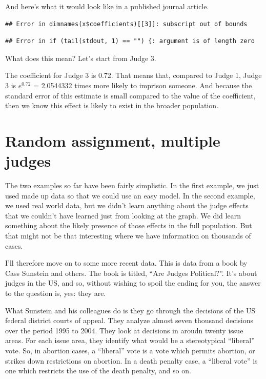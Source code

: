 \documentclass[12pt,twoside]{article}
\begin{document}
And here's what it would look like in a published journal article.

\begin{verbatim}
## Error in dimnames(x$coefficients)[[3]]: subscript out of bounds
\end{verbatim}

\begin{verbatim}
## Error in if (tail(stdout, 1) == "") {: argument is of length zero
\end{verbatim}

What does this mean? Let's start from Judge 3.

The coefficient for Judge 3 is 0.72. That means that, compared to Judge
1, Judge 3 is \(e^{0.72}\) = 2.0544332 times more likely to imprison
someone. And because the standard error of this estimate is small
compared to the value of the coefficient, then we know this effect is
likely to exist in the broader population.

\section{Random assignment, multiple
judges}\label{random-assignment-multiple-judges}

The two examples so far have been fairly simplistic. In the first
example, we just used made up data so that we could use an easy model.
In the second example, we used real world data, but we didn't learn
anything about the judge effects that we couldn't have learned just from
looking at the graph. We did learn something about the likely presence
of those effects in the full population. But that might not be that
interesting where we have information on thousands of cases.

I'll therefore move on to some more recent data. This is data from a
book by Cass Sunstein and others. The book is titled, ``Are Judges
Political?''. It's about judges in the US, and so, without wishing to
spoil the ending for you, the answer to the question is, yes: they are.

What Sunstein and his colleagues do is they go through the decisions of
the US federal district courts of appeal. They analyze almost seven
thousand decisions over the period 1995 to 2004. They look at decisions
in aroudn twenty issue areas. For each issue area, they identify what
would be a stereotypical ``liberal'' vote. So, in abortion cases, a
``liberal'' vote is a vote which permits abortion, or strikes down
restrictions on abortion. In a death penalty case, a ``liberal vote'' is
one which restricts the use of the death penalty, and so on.
\end{document}

